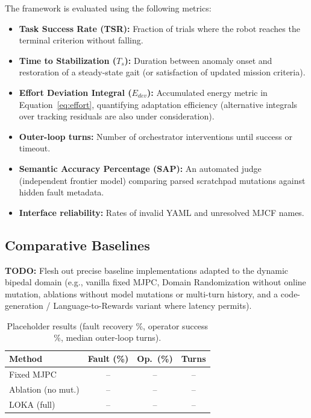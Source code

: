 The framework is evaluated using the following metrics:
\begin{itemize}
\item \textbf{Task Success Rate (TSR):} Fraction of trials where the robot reaches the terminal criterion without falling.
\item \textbf{Time to Stabilization ($T_s$):} Duration between anomaly onset and restoration of a steady-state gait (or satisfaction of updated mission criteria).
\item \textbf{Effort Deviation Integral ($E_{dev}$):} Accumulated energy metric in Equation~\ref{eq:effort}, quantifying adaptation efficiency (alternative integrals over tracking residuals are also under consideration).
\item \textbf{Outer-loop turns:} Number of orchestrator interventions until success or timeout.
\item \textbf{Semantic Accuracy Percentage (SAP):} An automated judge (independent frontier model) comparing parsed scratchpad mutations against hidden fault metadata.
\item \textbf{Interface reliability:} Rates of invalid YAML and unresolved MJCF names.
\end{itemize}

\subsection{Comparative Baselines}
\label{sec:baselines}

\textbf{TODO:} Flesh out precise baseline implementations adapted to the dynamic bipedal domain (e.g., vanilla fixed MJPC, Domain Randomization without online mutation, ablations without model mutations or multi-turn history, and a code-generation / Language-to-Rewards variant where latency permits).

\begin{table}[t]
  \centering
  \caption{Placeholder results (fault recovery \%, operator success \%, median outer-loop turns).}
  \label{tab:results}
  \setlength{\tabcolsep}{3.5pt}
  \begin{tabular}{@{}lccc@{}}
    \toprule
    Method & Fault (\%) & Op.\ (\%) & Turns \\
    \midrule
    Fixed MJPC & -- & -- & -- \\
    Ablation (no mut.) & -- & -- & -- \\
    LOKA (full) & -- & -- & -- \\
    \bottomrule
  \end{tabular}
\end{table}

